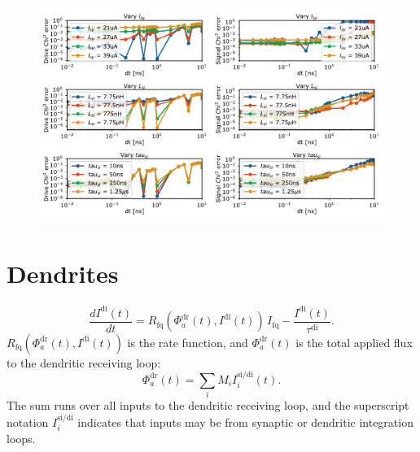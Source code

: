 \documentclass[twocolumn]{article}
\begin{document}
\begin{figure}[h!]
\includegraphics[width=17.2cm]{figures/_fig__synapses__error_vs_dt__3jj.pdf}
\end{figure}

\section{\label{sec:dendrites}Dendrites}

\begin{equation}
\label{eq:dendrites__leaky_integrator}
\frac{dI^{\mathrm{di}}(t)}{dt} = R_{\mathrm{fq}} \left( \Phi^{\mathrm{dr}}_a(t),I^{\mathrm{di}}(t) \right)\,I_{\mathrm{fq}} - \frac{I^{\mathrm{di}}(t)}{\tau^{\mathrm{di}}}.
\end{equation}
$R_{\mathrm{fq}} \left( \Phi^{\mathrm{dr}}_a(t),I^{\mathrm{di}}(t) \right)$ is the rate function, and $\Phi^{\mathrm{dr}}_a(t)$ is the total applied flux to the dendritic receiving loop:
\begin{equation}
\label{eq:dendrites__applied_flux}
\Phi^{\mathrm{dr}}_a(t) = \sum_i M_i I_i^{\mathrm{si/di}}(t).
\end{equation}
The sum runs over all inputs to the dendritic receiving loop, and the superscript notation $I_i^{\mathrm{si/di}}$ indicates that inputs may be from synaptic or dendritic integration loops.
\end{document}
